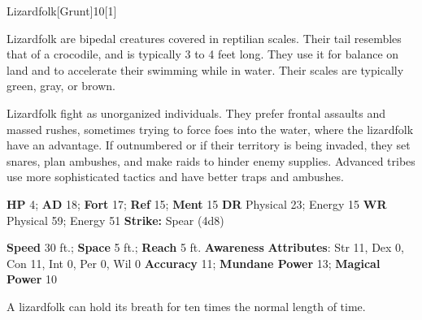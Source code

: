   \begin{monsection}{Lizardfolk}[Grunt]{10}[1]
    \vspace{-1em}\vspace{-1em}
    \vspace{0em}

    
    Lizardfolk are bipedal creatures covered in reptilian scales.
    Their tail resembles that of a crocodile, and is typically 3 to 4 feet long.
    They use it for balance on land and to accelerate their swimming while in water.
    Their scales are typically green, gray, or brown.

    Lizardfolk fight as unorganized individuals.
    They prefer frontal assaults and massed rushes, sometimes trying to force foes into the water, where the lizardfolk have an advantage.
    If outnumbered or if their territory is being invaded, they set snares, plan ambushes, and make raids to hinder enemy supplies.
    Advanced tribes use more sophisticated tactics and have better traps and ambushes.
  

    \begin{spellcontent}
      \begin{spelltargetinginfo}
        \pari \textbf{HP} 4;
          \textbf{AD} 18;
          \textbf{Fort} 17;
          \textbf{Ref} 15;
          \textbf{Ment} 15
        \pari \textbf{DR} Physical 23; Energy 15
        \pari \textbf{WR} Physical 59; Energy 51
        \pari \textbf{Strike:}
            Spear  (4d8)
      \end{spelltargetinginfo}
    \end{spellcontent}
    \begin{monsterfooter}
      \pari \textbf{Speed} 30 ft.;
        \textbf{Space} 5 ft.;
        \textbf{Reach} 5 ft.
      \pari \textbf{Awareness} 
      \pari \textbf{Attributes}:
        Str 11, Dex 0,
        Con 11, Int 0,
        Per 0, Wil 0
      \pari \textbf{Accuracy} 11;
        \textbf{Mundane Power} 13;
      \textbf{Magical Power} 10
    \end{monsterfooter}
  \end{monsection}
   A lizardfolk can hold its breath for ten times the normal length of time.
  
